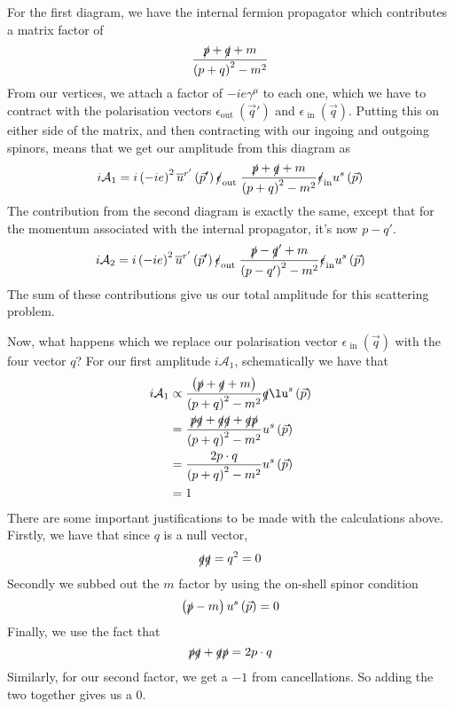 For the first diagram, 
we have the internal fermion propagator which 
contributes a matrix factor of 
\[
\frac{\slashed{p} + \slashed{q}  + m  }{\left(  p + q   \right)  ^ 2 
 - m^ 2 }
\] From our vertices, 
we attach a factor of $  - i e \gamma ^ \mu $ to each one, 
which we have to contract with the polarisation vectors $\epsilon_{ \text{out } }
\left( \vec{q} '   \right) $ and $ \epsilon_{ \text{ in } } \left(  \vec{q} \right) $. Putting this 
on either side of the matrix, and then contracting 
with our ingoing and outgoing spinors, 
means that we get our amplitude from this diagram as 
\[
i\mathcal{ A }_ 1  = i \left(  - i e  \right)  ^ 2 
\overline{ u } ^{ r ' } \left( \vec{p} '  \right)  
\slashed{\epsilon}_{ \text{out } } \frac{\slashed{p} + \slashed{q} + m }{
\left(  p + q  \right)  ^ 2  - m ^ 2 } \slashed{\epsilon}_{\text{in}}u ^ s \left(  \vec{p} \right) 
\] 
The contribution from the second diagram is exactly 
the same, except that for the momentum 
associated with the internal propagator, 
it's now $ p  - q' $. 
\[
i \mathcal{ A } _2 =	i \left(  - i e  \right)  ^ 2 
\overline{ u } ^{ r ' } \left( \vec{p} '  \right)  
\slashed{\epsilon}_{ \text{out } } \frac{\slashed{p}  -  \slashed{q} '  + m }{
\left(  p  - q'   \right)  ^ 2  - m ^ 2 } \slashed{\epsilon}_{\text{in}}u ^ s \left(  \vec{p} \right) 
\] The sum of these contributions 
give us our total amplitude for this scattering 
problem. 

Now, what happens which we replace our polarisation vector 
$ \epsilon_{ \text{ in } } \left(  \vec{q}  \right)  $ with the 
four vector $ q $? 
For our first amplitude $ i \mathcal{  A} _ 1 $, schematically we 
have that 
\begin{align*}
i\mathcal{ A } _ 1 & \propto \frac{\left(  \slashed{p} + 
\slashed{q} + m  \right) }{\left( p + q  \right)  ^ 2 - m ^ 2 } \slashed{q} \lu ^ s \left( \vec{p} \right) \\
&= \frac{\slashed{p}\slashed{q} + 
\slashed{q}\slashed{q} + \slashed{q}\slashed{p}}{
\left(  p + q  \right)  ^2   - m ^ 2 } u ^ s \left( \vec{p} \right)  \\
&=  \frac{ 2 p \cdot  q }{\left( p + q  \right)  ^ 2  - m ^ 2 }
u ^ s \left( \vec{p} \right) \\
&=  1 
\end{align*}
There are some important justifications
to be made with the calculations above. 
Firstly, we have that since $ q $ is a null vector, 
\[
\slashed{q} \slashed{q} = q ^ 2  = 0 
\] Secondly we subbed out the $ m $ factor 
by using the on-shell spinor condition 
\[
\left(  \slashed{p} - m   \right) u ^ s \left( \vec{p}  \right)   = 0 
\] Finally, 
we use the fact that 
\[
\slashed{p} \slashed{q} + \slashed{q} \slashed{p} = 2 p \cdot  q 
\] Similarly, for our second factor, we get a 
$  - 1 $ from cancellations. So adding the 
two together gives us a 0. 


